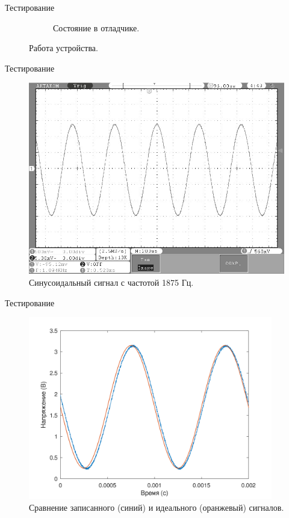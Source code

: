 \documentclass[10pt]{beamer}
\begin{document}
\begin{frame}{Тестирование}
\begin{figure}
\begin{subfigure}[H]{0.45\textwidth}
         \caption{Состояние в отладчике.}
     \end{subfigure}
        \caption{Работа устройства.}
\end{figure}
\end{frame}

\begin{frame}{Тестирование}
  \begin{figure}
  \includegraphics[width=1\textwidth]{1875}
  \caption{Синусоидальный сигнал с частотой 1875 Гц.}
  \end{figure}
\end{frame}

\begin{frame}{Тестирование}
  \begin{figure}
  \includegraphics[width=0.95\textwidth]{test}
  \caption{Сравнение записанного (синий) и идеального (оранжевый) сигналов.}
  \end{figure}
\end{frame}
\end{document}

